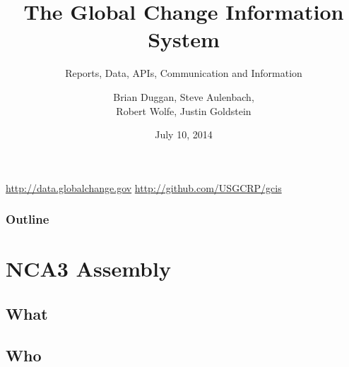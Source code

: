\documentclass{beamer}
\begin{document}
\title{The Global Change Information System}   
\subtitle{Reports, Data, APIs, Communication and Information}
\author{Brian Duggan, Steve Aulenbach, \\
Robert Wolfe, Justin Goldstein} 
\date{July 10, 2014} 

\begin{frame}[plain]
\titlepage
\begin{center}
\url{http://data.globalchange.gov}
\url{http://github.com/USGCRP/gcis}
\end{center}
\end{frame}

\begin{frame}[plain]
\frametitle{Outline}\tableofcontents 
\end{frame}

\section{NCA3 Assembly}



\subsection{What}

\subsection{Who}
\end{document}
